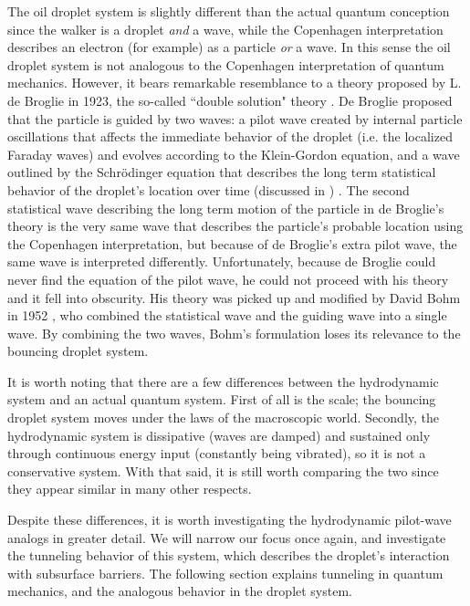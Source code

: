 The oil droplet system is slightly different than the actual quantum conception  since the walker is a droplet \textit{and} a wave, while the Copenhagen interpretation describes an electron (for example) as a particle \textit{or} a wave. In this sense the oil droplet system is not analogous to the Copenhagen interpretation of quantum mechanics. However, it bears remarkable resemblance to a theory proposed by L. de Broglie in 1923, the so-called ``double solution" theory . De Broglie proposed that the particle is guided by two waves: a pilot wave created by internal particle oscillations that affects the immediate behavior of the droplet (i.e. the localized Faraday waves) and evolves according to the Klein-Gordon equation, and a wave outlined by the Schr\"{o}dinger equation that describes the long term statistical behavior of the droplet's location over time (discussed in ) . The second statistical wave describing the long term motion of the particle in de Broglie's theory is the very same wave that describes the particle's probable location using the Copenhagen interpretation, but because of de Broglie's extra pilot wave, the same wave is interpreted differently. Unfortunately, because de Broglie could never find the equation of the pilot wave, he could not proceed with his theory and it fell into obscurity. His theory was picked up and modified by David Bohm in 1952 , who combined the statistical wave and the guiding wave into a single wave. By combining the two waves, Bohm's formulation loses its relevance to the bouncing droplet system.

It is worth noting that there are a few differences between the hydrodynamic system and an actual quantum system. First of all is the scale; the bouncing droplet system moves under the laws of the macroscopic world. Secondly, the hydrodynamic system is dissipative (waves are damped) and sustained only through continuous energy input (constantly being vibrated), so it is not a conservative system. With that said, it is still worth comparing the two since they appear similar in many other respects.

Despite these differences, it is worth investigating the hydrodynamic pilot-wave analogs in greater detail. We will narrow our focus once again, and investigate the tunneling behavior of this system, which describes the droplet's interaction with subsurface barriers. The following section explains tunneling in quantum mechanics, and the analogous behavior in the droplet system. 

